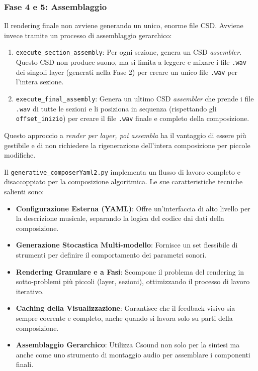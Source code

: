 \subsubsection{Fase 4 e 5: Assemblaggio}
Il rendering finale non avviene generando un unico, enorme file CSD. Avviene invece tramite un processo di assemblaggio gerarchico:

\begin{enumerate}
    \item \texttt{execute\_section\_assembly}: Per ogni sezione, genera un CSD \textit{assembler}. Questo CSD non produce suono, ma si limita a leggere e mixare i file \texttt{.wav} dei singoli layer (generati nella Fase 2) per creare un unico file \texttt{.wav} per l'intera sezione.
    \item \texttt{execute\_final\_assembly}: Genera un ultimo CSD \textit{assembler} che prende i file \texttt{.wav} di tutte le sezioni e li posiziona in sequenza (rispettando gli \texttt{offset\_inizio}) per creare il file \texttt{.wav} finale e completo della composizione.
\end{enumerate}
Questo approccio a \textit{render per layer, poi assembla} ha il vantaggio di essere più gestibile e di non richiedere la rigenerazione dell'intera composizione per piccole modifiche.

Il \texttt{generative\_composerYaml2.py} implementa un flusso di lavoro completo e disaccoppiato per la composizione algoritmica. Le sue caratteristiche tecniche salienti sono:

\begin{itemize}
 \item \textbf{Configurazione Esterna (YAML)}: Offre un'interfaccia di alto livello per la descrizione musicale, separando la logica del codice dai dati della composizione.
 \item \textbf{Generazione Stocastica Multi-modello}: Fornisce un set flessibile di strumenti per definire il comportamento dei parametri sonori.
 \item \textbf{Rendering Granulare e a Fasi}: Scompone il problema del rendering in sotto-problemi più piccoli (layer, sezioni), ottimizzando il processo di lavoro iterativo.
 \item \textbf{Caching della Visualizzazione}: Garantisce che il feedback visivo sia sempre coerente e completo, anche quando si lavora solo su parti della composizione.
 \item \textbf{Assemblaggio Gerarchico}: Utilizza Csound non solo per la sintesi ma anche come uno strumento di montaggio audio per assemblare i componenti finali.
\end{itemize}